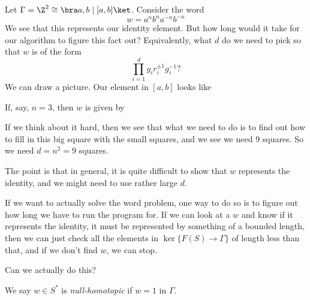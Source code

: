 \documentclass[a4paper]{article}
\begin{document}
\begin{eg}
  Let $\Gamma = \Z^2 \cong \bra a, b \mid [a, b]\ket$. Consider the word
  \[
    w = a^n b^n a^{-n} b^{-n}
  \]
  We see that this represents our identity element. But how long would it take for our algorithm to figure this fact out? Equivalently, what $d$ do we need to pick so that $w$ is of the form
  \[
    \prod_{i = 1}^d g_i r_i^{\pm 1} g_i^{-1}?
  \]
  We can draw a picture. Our element in $[a, b]$ looks like
  \begin{center}
  \end{center}
  If, say, $n = 3$, then $w$ is given by
  \begin{center}
  \end{center}
  If we think about it hard, then we see that what we need to do is to find out how to fill in this big square with the small squares, and we see we need $9$ squares. So we need $d = n^2 = 9$ squares.
\end{eg}

The point is that in general, it is quite difficult to show that $w$ represents the identity, and we might need to use rather large $d$.

If we want to actually solve the word problem, one way to do so is to figure out how long we have to run the program for. If we can look at a $w$ and know if it represents the identity, it must be represented by something of a bounded length, then we can just check all the elements in $\ker \{F(S) \to \Gamma\}$ of length less than that, and if we don't find $w$, we can stop.

Can we actually do this?

\begin{defi}
  We say $w \in S^*$ is \emph{null-homotopic} if $w = 1$ in $\Gamma$.
\end{defi}
\end{document}
